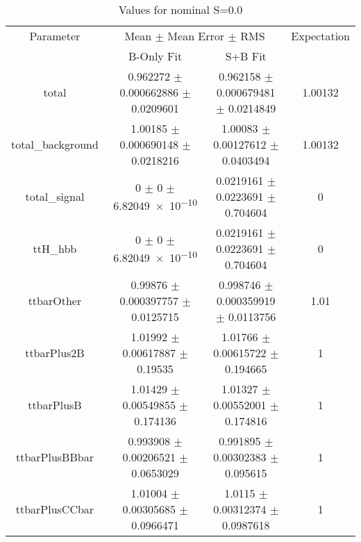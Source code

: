 \begin{table}
\centering
\caption{Values for nominal S=0.0}
\begin{tabular}{cccc}
\toprule
Parameter & \multicolumn{2}{c}{Mean $\pm$ Mean Error $\pm$ RMS} & Expectation\\
 & B-Only Fit & S+B Fit & \\
\midrule
total & \num{0.962272} $\pm$ \num{0.000662886} $\pm$ \num{0.0209601} & \num{0.962158} $\pm$ \num{0.000679481} $\pm$ \num{0.0214849} & \num{1.00132}\\
total\_background & \num{1.00185} $\pm$ \num{0.000690148} $\pm$ \num{0.0218216} & \num{1.00083} $\pm$ \num{0.00127612} $\pm$ \num{0.0403494} & \num{1.00132}\\
total\_signal & \num{0} $\pm$ \num{0} $\pm$ \num{6.82049e-10} & \num{0.0219161} $\pm$ \num{0.0223691} $\pm$ \num{0.704604} & \num{0}\\
ttH\_hbb & \num{0} $\pm$ \num{0} $\pm$ \num{6.82049e-10} & \num{0.0219161} $\pm$ \num{0.0223691} $\pm$ \num{0.704604} & \num{0}\\
ttbarOther & \num{0.99876} $\pm$ \num{0.000397757} $\pm$ \num{0.0125715} & \num{0.998746} $\pm$ \num{0.000359919} $\pm$ \num{0.0113756} & \num{1.01}\\
ttbarPlus2B & \num{1.01992} $\pm$ \num{0.00617887} $\pm$ \num{0.19535} & \num{1.01766} $\pm$ \num{0.00615722} $\pm$ \num{0.194665} & \num{1}\\
ttbarPlusB & \num{1.01429} $\pm$ \num{0.00549855} $\pm$ \num{0.174136} & \num{1.01327} $\pm$ \num{0.00552001} $\pm$ \num{0.174816} & \num{1}\\
ttbarPlusBBbar & \num{0.993908} $\pm$ \num{0.00206521} $\pm$ \num{0.0653029} & \num{0.991895} $\pm$ \num{0.00302383} $\pm$ \num{0.095615} & \num{1}\\
ttbarPlusCCbar & \num{1.01004} $\pm$ \num{0.00305685} $\pm$ \num{0.0966471} & \num{1.0115} $\pm$ \num{0.00312374} $\pm$ \num{0.0987618} & \num{1}\\
\bottomrule
\end{tabular}
\end{table}